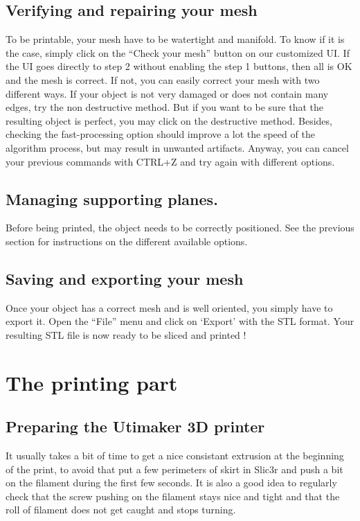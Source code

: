 \documentclass{article}
\begin{document}
\subsection{Verifying and repairing your mesh}

To be printable, your mesh have to be watertight and manifold. To know if it is the case, simply click on the ``Check your mesh'' button on our customized UI. If the UI goes directly to step 2 without enabling the step 1 buttons, then all is OK and the mesh is correct. If not, you can easily correct your mesh with two different ways. If your object is not very damaged or does not contain many edges, try the non destructive method. But if you want to be sure that the resulting object is perfect, you may click on the destructive method. Besides, checking the fast-processing option should improve a lot the speed of the algorithm process, but may result in unwanted artifacts. Anyway, you can cancel your previous commands with CTRL+Z and try again with different options.

\subsection{Managing supporting planes.}
Before being printed, the object needs to be correctly positioned. See the previous section for instructions on the different available options.

\subsection{Saving and exporting your mesh}

Once your object has a correct mesh and is well oriented, you simply have to export it. Open the ``File'' menu and click on `Export' with the STL format. Your resulting STL file is now ready to be sliced and printed !

\newpage

\section{The printing part}

\subsection{Preparing the Utimaker 3D printer}

It usually takes a bit of time to get a nice consistant extrusion at the beginning of the print, to avoid that put a few perimeters of skirt in Slic3r and push a bit on the filament during the first few seconds.
It is also a good idea to regularly check that the screw pushing on the filament stays nice and tight and that the roll of filament does not get caught and stops turning.
\end{document}
